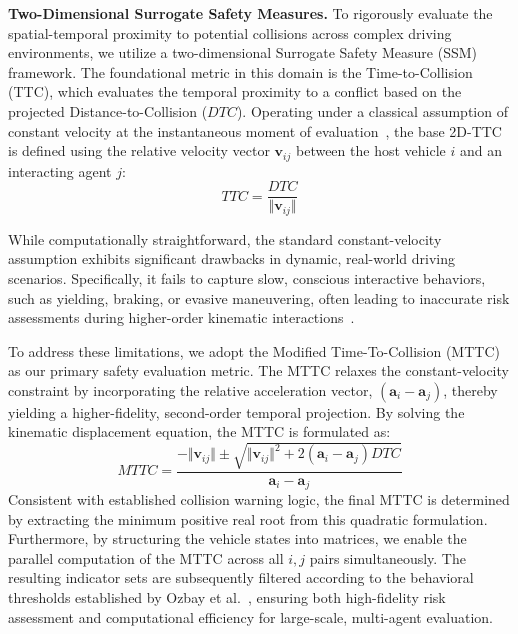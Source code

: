 \documentclass{article}
\begin{document}
\textbf{Two-Dimensional Surrogate Safety Measures.} To rigorously evaluate the spatial-temporal proximity to potential collisions across complex driving environments, we utilize a two-dimensional Surrogate Safety Measure (SSM) framework. The foundational metric in this domain is the Time-to-Collision (TTC), which evaluates the temporal proximity to a conflict based on the projected Distance-to-Collision ($DTC$). Operating under a classical assumption of constant velocity at the instantaneous moment of evaluation~\cite{tarko2018surrogate}, the base 2D-TTC is defined using the relative velocity vector $\boldsymbol{v}_{ij}$ between the host vehicle $i$ and an interacting agent $j$:
\begin{equation}
    TTC = \frac{DTC}{\Vert\boldsymbol{v}_{ij}\Vert}
\end{equation}

While computationally straightforward, the standard constant-velocity assumption exhibits significant drawbacks in dynamic, real-world driving scenarios. Specifically, it fails to capture slow, conscious interactive behaviors, such as yielding, braking, or evasive maneuvering, often leading to inaccurate risk assessments during higher-order kinematic interactions~\cite{guo2023modeling, laureshyn2010evaluation}.

To address these limitations, we adopt the Modified Time-To-Collision (MTTC) as our primary safety evaluation metric. The MTTC relaxes the constant-velocity constraint by incorporating the relative acceleration vector, $(\boldsymbol{a}_i - \boldsymbol{a}_j)$, thereby yielding a higher-fidelity, second-order temporal projection. By solving the kinematic displacement equation, the MTTC is formulated as:
\begin{equation}
    MTTC = \frac{-\Vert\boldsymbol{v}_{ij}\Vert \pm \sqrt{\Vert\boldsymbol{v}_{ij}\Vert^2 + 2(\boldsymbol{a}_i - \boldsymbol{a}_j)DTC}}{\boldsymbol{a}_i - \boldsymbol{a}_j}
\end{equation}
Consistent with established collision warning logic, the final MTTC is determined by extracting the minimum positive real root from this quadratic formulation. Furthermore, by structuring the vehicle states into matrices, we enable the parallel computation of the MTTC across all $i,j$ pairs simultaneously. The resulting indicator sets are subsequently filtered according to the behavioral thresholds established by Ozbay et al.~\cite{ozbay2008derivation}, ensuring both high-fidelity risk assessment and computational efficiency for large-scale, multi-agent evaluation.
\end{document}
